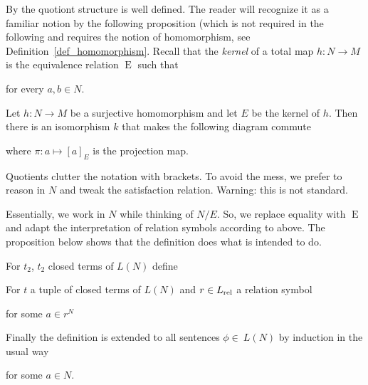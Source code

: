 \documentclass[creche.tex]{subfiles}
\begin{document}
By  the quotiont structure is well defined.
The reader will recognize it as a familiar notion by the following proposition (which is not required in the following and requires the notion of homomorphism, see Definition~\ref{def_homomorphism}.
Recall that the \emph{kernel\/} of a total map $h:N\to M$ is the equivalence relation $\mathrel{E}$ such that


for every $a,b\in N$.

\begin{proposition}
Let $h:N\to M$ be a surjective homomorphism and let $E$ be the kernel of $h$.
Then there is an isomorphism $k$ that makes the following diagram commute


\hspace*{25ex}

where $\pi:a\mapsto [a]_E$ is the projection map.\QED
\end{proposition}


\noindent\llap{\textcolor{red}{\Large\danger}\kern1.5ex}Quotients clutter the notation with brackets.
To avoid the mess, we prefer to reason in $N$ and tweak the satisfaction relation.
 Warning: this is not standard.

Essentially, we work in $N$ while thinking of $N/E$.
So, we replace equality with $\mathrel{E}$ and adapt the interpretation of relation symbols according to  above.
The proposition below shows that the definition does what is intended to do.

\begin{definition}\label{def_pseudostructure}
For $t_2$, $t_2$ closed terms of $L(N)$ define


For $t$ a tuple of closed terms of $L(N)$ and $r\in L_{\rm rel}$ a relation symbol

\quad for some $a\in r^N$

Finally the definition is extended to all sentences $\phi\in\ L(N)$ by induction in the usual way



\quad for some $a\in N$.\QED
\end{definition}
\end{document}

